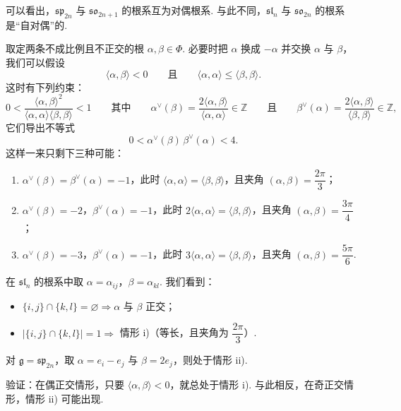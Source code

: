 \begin{example*}
可以看出，$\mathfrak{sp}_{2n}$ 与 $\mathfrak{so}_{2n+1}$ 的根系互为对偶根系. 与此不同，$\mathfrak{sl}_n$ 与 $\mathfrak{so}_{2n}$ 的根系是``自对偶''的.
\end{example*}
\begin{numpara}[两条根之间的约束]\label{np:ssl-3-2-5}
取定两条不成比例且不正交的根 $\alpha,\beta\in\Phi$. 必要时把 $\alpha$ 换成 $-\alpha$ 并交换 $\alpha$ 与 $\beta$，我们可以假设
\[
\langle\alpha,\beta\rangle<0
\qquad\text{且}\qquad
\langle\alpha,\alpha\rangle\leqslant\langle\beta,\beta\rangle.
\]
这时有下列约束：
\[
0<\frac{\langle\alpha,\beta\rangle^{2}}{\langle\alpha,\alpha\rangle\langle\beta,\beta\rangle}<1
\qquad\text{其中}\qquad
\alpha^{\vee}(\beta)=\frac{2\langle\alpha,\beta\rangle}{\langle\alpha,\alpha\rangle}\in\mathbb{Z}
\qquad\text{且}\qquad
\beta^{\vee}(\alpha)=\frac{2\langle\alpha,\beta\rangle}{\langle\beta,\beta\rangle}\in\mathbb{Z},
\]
它们导出不等式
\[0<\alpha^{\vee}(\beta)\,\beta^{\vee}(\alpha)<4.\]
这样一来只剩下三种可能：
\begin{enumerate}[label=\roman*)]
\item $\alpha^{\vee}(\beta)=\beta^{\vee}(\alpha)=-1$，此时 $\langle\alpha,\alpha\rangle=\langle\beta,\beta\rangle$，且夹角 $(\alpha,\beta)=\dfrac{2\pi}{3}$；
\item $\alpha^{\vee}(\beta)=-2$，$\beta^{\vee}(\alpha)=-1$，此时 $2\langle\alpha,\alpha\rangle=\langle\beta,\beta\rangle$，且夹角 $(\alpha,\beta)=\dfrac{3\pi}{4}$；
\item $\alpha^{\vee}(\beta)=-3$，$\beta^{\vee}(\alpha)=-1$，此时 $3\langle\alpha,\alpha\rangle=\langle\beta,\beta\rangle$，且夹角 $(\alpha,\beta)=\dfrac{5\pi}{6}$.
\end{enumerate}
\end{numpara}
\begin{example*}
在 $\mathfrak{sl}_n$ 的根系中取 $\alpha=\alpha_{ij}$，$\beta=\alpha_{kl}$. 我们看到：
\begin{itemize}
\item $\{i,j\}\cap\{k,l\}=\varnothing\Rightarrow\alpha$ 与 $\beta$ 正交；
\item $|\{i,j\}\cap\{k,l\}|=1\Rightarrow$ 情形 i)（等长，且夹角为 $\dfrac{2\pi}{3}$）.
\end{itemize}
\end{example*}
\begin{example*}
对 $\mathfrak g=\mathfrak{sp}_{2n}$，取 $\alpha=e_i-e_j$ 与 $\beta=2e_j$，则处于情形 ii).
\end{example*}
\begin{exercise*}
验证：在偶正交情形，只要 $\langle\alpha,\beta\rangle<0$，就总处于情形 i). 与此相反，在奇正交情形，情形 ii) 可能出现.
\end{exercise*}

